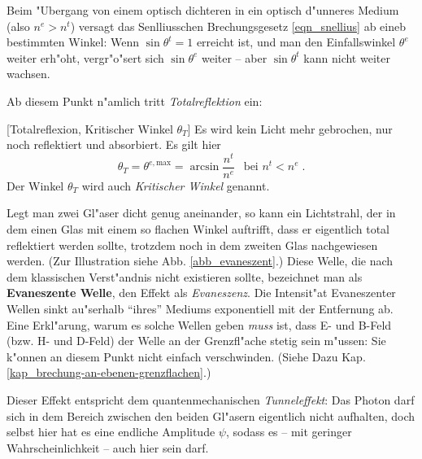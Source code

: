 \documentclass[twoside,a4paper]{book}
\newenvironment{Def}[1][]{%
\definecolor{shadethmcolor}{rgb}{.95,.95,.95}%
\definecolor{shaderulecolor}{rgb}{0.8,0.8,0.8}%
\setlength{\shadeboxrule}{1pt}%
\begin{Defi}[#1]%
 }{\end{Defi}}
\begin{document}
Beim "Ubergang von einem optisch dichteren in ein optisch d"unneres
Medium (also $n^e > n^t$) versagt das Senlliusschen Brechungsgesetz
\eqref{eqn_snellius} ab eineb bestimmten Winkel: Wenn $\sin \theta^t =
1$ erreicht ist, und man den Einfallswinkel $\theta^e$ weiter erh"oht,
vergr"o"sert sich $\sin \theta^e$ weiter -- aber $\sin\theta^t$ kann
nicht weiter wachsen.

Ab diesem Punkt n"amlich tritt
\emph{Totalreflektion} ein:
\begin{Def}
   [Totalreflexion, Kritischer Winkel $\theta_T$]
   Es wird kein Licht mehr gebrochen, nur noch reflektiert und
   absorbiert. Es gilt hier
   \begin{equation}
      \label{eqn_totalreflektion}
      \theta_T = \theta^{e, \text{max}} = \arcsin \frac{n^t}{n^e} ~  ~ \text{ bei } n^t <
      n^e \;.
   \end{equation}
   Der Winkel $\theta_T$ wird auch \emph{Kritischer Winkel} genannt.
\end{Def}


Legt man zwei Gl"aser dicht genug aneinander, so kann ein Lichtstrahl,
der in dem einen Glas mit einem so flachen Winkel auftrifft, dass er
eigentlich total reflektiert werden sollte, trotzdem noch in dem
zweiten Glas nachgewiesen werden. (Zur Illustration siehe
Abb. \ref{abb_evaneszent}.)  Diese Welle, die nach dem
klassischen Verst"andnis nicht existieren sollte, bezeichnet man als
\textbf{Evaneszente Welle}, den Effekt als
\emph{Evaneszenz}. Die Intensit"at Evaneszenter Wellen sinkt
au"serhalb "`ihres"' Mediums exponentiell mit der Entfernung ab. Eine
Erkl"arung, warum es solche Wellen geben \emph{muss} ist, dass E- und
B-Feld (bzw. H- und D-Feld) der Welle an der Grenzfl"ache stetig sein
m"ussen: Sie k"onnen an diesem Punkt nicht einfach
verschwinden. (Siehe Dazu
Kap. \ref{kap_brechung-an-ebenen-grenzflachen}.) 

Dieser Effekt entspricht dem quantenmechanischen
\emph{Tunneleffekt}: Das Photon darf sich in dem
Bereich zwischen den beiden Gl"asern eigentlich nicht aufhalten, doch
selbst hier hat es eine endliche Amplitude $\psi$, sodass es -- mit
geringer Wahrscheinlichkeit -- auch hier sein darf.
\end{document}

